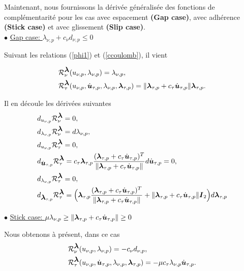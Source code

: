 Maintenant, nous fournissons la dérivée généralisée des fonctions de complémentarité pour les cas avec espacement \textbf{(Gap case)}, avec adhérence \textbf{(Stick case)} et avec glissement \textbf{(Slip case)}.\\

$\bullet$ \underline{Gap case: $\lambda_{\nu, p}+c_{\nu}d_{\nu,p}\le 0$}

\noindent Suivant les relations (\ref{phi1}) et (\ref{ccoulomb}), il vient

\begin{align*}
&{\cal R}_{\nu}^{\mbox{\boldmath{$\lambda$}}}(u_{\nu, p},\lambda_{\nu, p})=\lambda_{\nu, p},\\
&{\cal R}_{\tau}^{\mbox{\boldmath{$\lambda$}}}(u_{\nu, p},\dot{\mbox{\boldmath{$u$}}}_{\tau, p},\lambda_{\nu, p},\mbox{\boldmath{$\lambda$}}_{\tau, p})=\|\mbox{\boldmath{$\lambda$}}_{\tau, p}+c_\tau \dot{\mbox{\boldmath{$u$}}}_{\tau, p}\|\mbox{\boldmath{$\lambda$}}_{\tau, p}.
\end{align*}

\noindent Il en découle les dérivées suivantes
\begin{align}
&d_{u_{\nu, p}} {\cal R}_{\nu}^{\mbox{\boldmath{$\lambda$}}}=0\label{phi11},\\
&d_{\lambda_{\nu, p}} {\cal R}_{\nu}^{\mbox{\boldmath{$\lambda$}}}=d{\lambda_{\nu, p}}\label{phi12},\\
&d_{u_{\nu, p}} {\cal R}_{\tau}^{\mbox{\boldmath{$\lambda$}}}=0,\label{phi21}\\
&d_{\dot{\mbox{\boldmath{$u$}}}_{\tau, p}} {\cal R}_{\tau}^{\mbox{\boldmath{$\lambda$}}}=c_\tau \mbox{\boldmath{$\lambda$}}_{\tau, p}\frac{(\mbox{\boldmath{$\lambda$}}_{\tau, p}+c_\tau \dot{\mbox{\boldmath{$u$}}}_{\tau, p})^T}{\|\mbox{\boldmath{$\lambda$}}_{\tau, p}+c_\tau \dot{\mbox{\boldmath{$u$}}}_{\tau, p}\|}d{\dot{\mbox{\boldmath{$u$}}}_{\tau, p}}=0,\label{phi22}\\
&d_{\lambda_{\nu, p}} {\cal R}_{\tau}^{\mbox{\boldmath{$\lambda$}}}=0,\label{phi23}\\
&d_{\mbox{\boldmath{$\lambda$}}_{\tau, p}} {\cal R}_{\tau}^{\mbox{\boldmath{$\lambda$}}}=\Big(\mbox{\boldmath{$\lambda$}}_{\tau, p}\frac{(\mbox{\boldmath{$\lambda$}}_{\tau, p}+c_\tau \dot{\mbox{\boldmath{$u$}}}_{\tau, p})^T}{\|\mbox{\boldmath{$\lambda$}}_{\tau, p}+c_\tau \dot{\mbox{\boldmath{$u$}}}_{\tau, p}\|}+\|\mbox{\boldmath{$\lambda$}}_{\tau, p}+c_\tau \dot{\mbox{\boldmath{$u$}}}_{\tau, p}\|\mbox{\boldmath{$I$}}_2 \Big)d{\mbox{\boldmath{$\lambda$}}_{\tau, p}}
\end{align}

$\bullet$ \underline{Stick case: $\mu \lambda_{\nu, p}\ge \|\mbox{\boldmath{$\lambda$}}_{\tau, p}+c_\tau \dot{\mbox{\boldmath{$u$}}}_{\tau, p}\|\ge 0$}

\noindent Nous obtenons à présent, dans ce cas
\begin{align*}
&{\cal R}_{\nu}^{\mbox{\boldmath{$\lambda$}}}(u_{\nu, p},\lambda_{\nu, p})=-c_{\nu}d_{\nu,p},\\
&{\cal R}_{\tau}^{\mbox{\boldmath{$\lambda$}}}(u_{\nu, p},\dot{\mbox{\boldmath{$u$}}}_{\tau, p},\lambda_{\nu, p},\mbox{\boldmath{$\lambda$}}_{\tau, p})=-\mu c_\tau \lambda_{\nu, p}\dot{\mbox{\boldmath{$u$}}}_{\tau, p}.
\end{align*}


